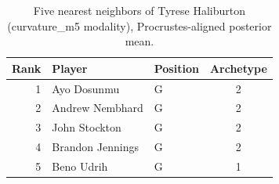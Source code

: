 \begin{table}[htbp]
  \centering\small
  \begin{tabular}{rllc}
    \toprule
    Rank & Player & Position & Archetype \\
    \midrule
    1 & Ayo Dosunmu & G & 2 \\
    2 & Andrew Nembhard & G & 2 \\
    3 & John Stockton & G & 2 \\
    4 & Brandon Jennings & G & 2 \\
    5 & Beno Udrih & G & 1 \\
    \bottomrule
  \end{tabular}
  \caption{Five nearest neighbors of Tyrese Haliburton (curvature_m5 modality), Procrustes-aligned posterior mean.}
  \label{tab:Tyrese_Haliburton_neighbors_curvature_m5}
\end{table}


